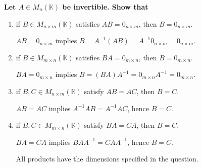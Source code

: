\providecommand{\rank}{\operatorname{r}}
\providecommand{\RR}{\mathbb R}
\providecommand{\CC}{\mathbb C}
\providecommand{\KK}{\mathbb K}

\setcounter{enumi}{24}
\item {\bfseries\boldmath
Let $A\in M_n(\KK)$ be invertible. Show that
}

\begin{enumerate}[label=\alph*)]

\item if $B\in M_{n\times m}(\KK)$ satisfies $AB=0_{n\times m}$, then $B=0_{n\times m}$.

\begin{answer}
$AB=0_{n\times m}$ implies
$B=A^{-1}(AB)=A^{-1}0_{n\times m}=0_{n\times m}$.
\end{answer}

\item if $B\in M_{m\times n}(\KK)$ satisfies $BA=0_{m\times n}$, then $B=0_{m\times n}$.

\begin{answer}
$BA=0_{m\times n}$ implies
$B=(BA)A^{-1}=0_{m\times n}A^{-1}=0_{m\times n}$.
\end{answer}

\item if $B,C\in M_{n\times m}(\KK)$ satisfy $AB=AC$, then $B=C$.

\begin{answer}
$AB=AC$ implies $A^{-1}AB=A^{-1}AC$, hence $B=C$.
\end{answer}

\item if $B,C\in M_{m\times n}(\KK)$ satisfy $BA=CA$, then $B=C$.

\begin{answer}
$BA=CA$ implies $BAA^{-1}=CAA^{-1}$, hence $B=C$.

All products have the dimensions specified in the question.
\end{answer}
\end{enumerate}
